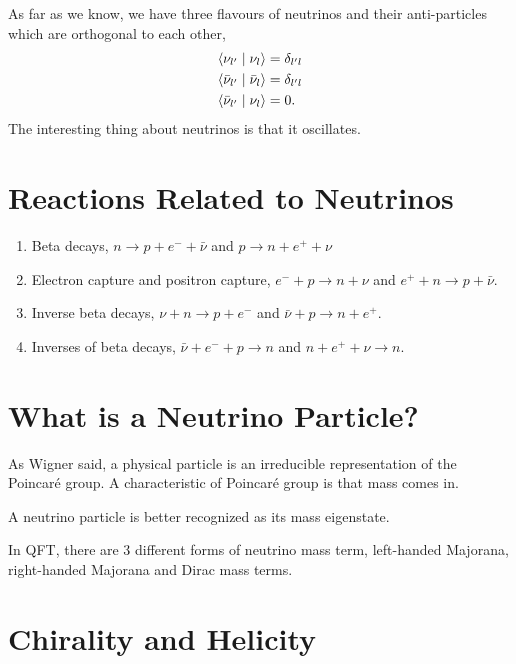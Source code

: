 \documentclass[letterpaper,12pt,english]{sphinxmanual}
\newcommand{\braket}[2]{\langle #1 \mid #2 \rangle}
\begin{document}
As far as we know, we have three flavours of neutrinos and their anti-particles which are  orthogonal to each other,
\begin{gather}
\begin{split}\braket{\nu_{l'}}{\nu_l} &= \delta_{l'l} \\
\braket{\bar\nu_{l'}}{\bar\nu_l} &= \delta_{l'l} \\
\braket{\bar\nu_{l'}}{\nu_l} &= 0.\end{split}\notag
\end{gather}
The interesting thing about neutrinos is that it oscillates.


\section{Reactions Related to Neutrinos}
\label{preliminary:reactions-related-to-neutrinos}\begin{enumerate}
\item {} 
Beta decays, \(n\to p + e^- +\bar \nu\) and \(p\to n + e^+ +\nu\)

\item {} 
Electron capture and positron capture, \(e^- + p\to n+\nu\) and \(e^+ + n \to p + \bar \nu\).

\item {} 
Inverse beta decays, \(\nu+ n \to p+e^-\) and \(\bar\nu + p \to n + e^+\).

\item {} 
Inverses of beta decays, \(\bar\nu + e^- + p \to n\) and \(n+e^++\nu \to n\).

\end{enumerate}


\section{What is a Neutrino Particle?}
\label{preliminary:what-is-a-neutrino-particle}
As Wigner said, a physical particle is an irreducible representation of the Poincaré group. A characteristic of Poincaré group is that mass comes in.

A neutrino particle is better recognized as its mass eigenstate.

In QFT, there are 3 different forms of neutrino mass term, left-handed Majorana, right-handed Majorana and Dirac mass terms.


\section{Chirality and Helicity}
\label{preliminary:chirality-and-helicity}
\end{document}
